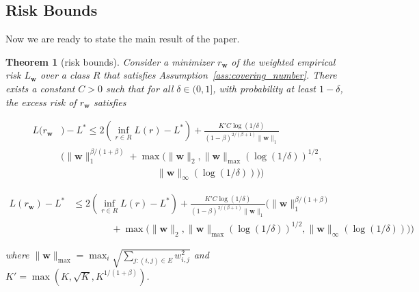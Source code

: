 \documentclass[letterpaper]{article} %
\def\DoubleColumn{}
\def\DoubleColumnEnd{}
\def\SingleColumn{}
\def\SingleColumnEnd{}
\newtheorem{theorem}{Theorem}
\newcommand{\weight}{\mathbf{w}}
\newcommand{\bayeserror}{L^*}
\newcommand{\empiricalrisk}[1]{L_{#1}}
\newcommand{\risk}{L}
\newcommand{\pair}[1]{(#1)}
\newcommand{\normo}[1]{\|#1\|_1}
\newcommand{\complexbound}{\beta}
\begin{document}
\subsection{Risk Bounds} %
\label{sub:risk_bounds}
Now we are ready to state the main result of the paper.
\begin{theorem}[risk bounds]
    \label{th:main_theorem}
    Consider a minimizer $r_\weight{}$ of the weighted empirical risk $\empiricalrisk{\weight{}}$ over a class $R$ that satisfies Assumption~\ref{ass:covering_number}. There exists a constant $C>0$ such that for all $\delta\in(0,1]$, with probability at least $1-\delta$, the excess risk of $r_\weight{}$ satisfies
    \DoubleColumn
    \begin{equation}
        \begin{aligned}
            \label{eq:main_result}
            \risk(r_\weight{}&)-\bayeserror \le 2(\inf_{r\in R}\risk(r)-\bayeserror) + \frac{K'C\log(1/\delta)}{(1-\complexbound)^{2/(\complexbound+1)}\normo{\weight{}}}\\
            &\Bigg(\normo{\weight{}}^{\complexbound/(1+\complexbound)}+\max\Big(\|\weight{}\|_2,\|\weight{}\|_{\max}(\log(1/\delta))^{1/2},\\
            &\qquad\qquad\qquad\qquad\qquad\|\weight{}\|_\infty(\log(1/\delta))\Big)\Bigg)
        \end{aligned}
    \end{equation}
    \DoubleColumnEnd
    \SingleColumn
    \begin{equation}
        \begin{aligned}
            \label{eq:main_result}
            \risk(r_\weight{})-\bayeserror &\le 2(\inf_{r\in R}\risk(r)-\bayeserror) + \frac{K'C\log(1/\delta)}{(1-\complexbound)^{2/(\complexbound+1)}\normo{\weight{}}}\Bigg(\normo{\weight{}}^{\complexbound/(1+\complexbound)}\\
            &\qquad\qquad+\max\Big(\|\weight{}\|_2,\|\weight{}\|_{\max}(\log(1/\delta))^{1/2},\|\weight{}\|_\infty(\log(1/\delta))\Big)\Bigg)
        \end{aligned}
    \end{equation}
    \SingleColumnEnd
    where $\|\weight{}\|_{\max}=\max_i \sqrt{\sum_{j:\pair{i,j}\in E} w_{i,j}^2}$ and $K'=\max(K,\sqrt{K},K^{1/(1+\complexbound{})})$.
\end{theorem}
\end{document}

